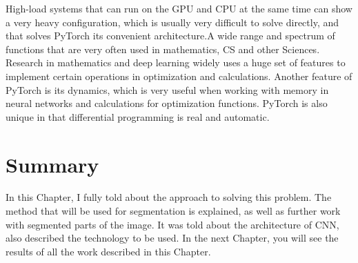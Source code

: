 \par High-load systems that can run on the GPU and CPU at the same time can show a very heavy configuration, which is usually very difficult to solve directly, and that solves PyTorch its convenient architecture.A wide range and spectrum of functions that are very often used in mathematics, CS and other Sciences. Research in mathematics and deep learning widely uses a huge set of features to implement certain operations in optimization and calculations. Another feature of PyTorch is its dynamics, which is very useful when working with memory in neural networks and calculations for optimization functions. PyTorch is also unique in that differential programming is real and automatic.\cite{PyTorch}


\section{Summary}\label{sec:4.5}
\par In this Chapter, I fully told about the approach to solving this problem. The method that will be used for segmentation is explained, as well as further work with segmented parts of the image. It was told about the architecture of CNN, also described the technology to be used. In the next Chapter, you will see the results of all the work described in this Chapter.